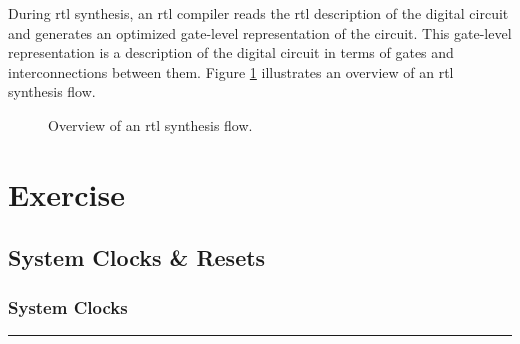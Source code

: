 \documentclass[a4paper,11pt]{article}%
\begin{document}
During \ac{rtl} synthesis, an \ac{rtl} compiler reads the \ac{rtl} description of the digital circuit and generates an optimized gate-level representation of the circuit. This gate-level representation is a description of the digital circuit in terms of gates and interconnections between them. Figure \ref{fig:asic_flow} illustrates an overview of an \ac{rtl} synthesis flow.


\begin{figure}[H]
	\centering
	\caption{Overview of an \ac{rtl} synthesis flow\cite{genus_user_guide_2019}.}
	\label{fig:asic_flow}
\end{figure}

\section{Exercise}

\subsection{System Clocks \& Resets}

\subsubsection{System Clocks}





\vfill
\hrule
\vspace{0.5cm}



\end{document}
